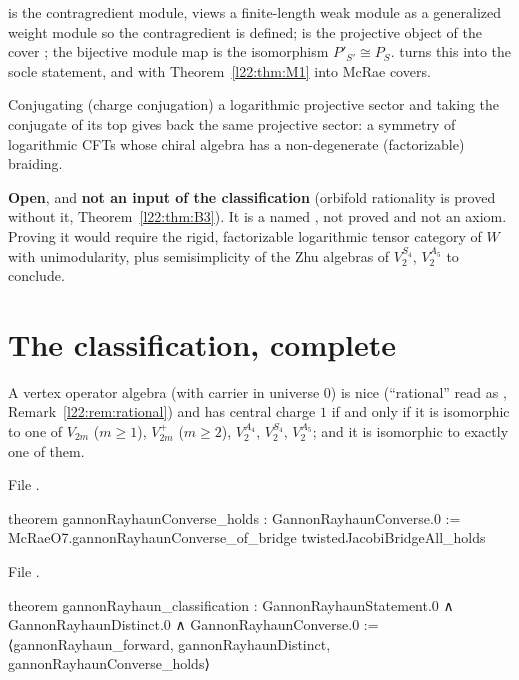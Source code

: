 \begin{dictionary}
 is the contragredient module,  views a finite-length weak module as a generalized
weight module so the contragredient is defined;  is the projective object of the cover ; the bijective
module map  is the isomorphism $P'_{S'}\cong P_S$.  turns this into the
socle statement, and with Theorem~\ref{l22:thm:M1} into McRae covers.
\end{dictionary}

\begin{physics}
Conjugating (charge conjugation) a logarithmic projective sector and taking the conjugate of its top gives back the same
projective sector: a symmetry of logarithmic CFTs whose chiral algebra has a non-degenerate (factorizable) braiding.
\end{physics}

\begin{status}
\textbf{Open}, and \textbf{not an input of the classification} (orbifold rationality is proved without it,
Theorem~\ref{l22:thm:B3}). It is a named , not proved and not an axiom. Proving it would require the rigid, factorizable logarithmic tensor category of $W$ with unimodularity, plus
semisimplicity of the Zhu algebras of $V_2^{S_4}$, $V_2^{A_5}$ to conclude.
\end{status}

\section{The classification, complete}\label{l22:sec:final}

\begin{theorem}\label{l22:thm:final}
A vertex operator algebra (with carrier in universe $0$) is nice (``rational'' read as ,
Remark~\ref{l22:rem:rational}) and has central charge $1$ if and only if it is
isomorphic to one of $V_{2m}$ ($m\ge1$), $V_{2m}^+$ ($m\ge2$), $V_2^{A_4}$, $V_2^{S_4}$, $V_2^{A_5}$; and it is
isomorphic to exactly one of them.
\end{theorem}
\noindent File .
\begin{leancode}
theorem gannonRayhaunConverse_holds : GannonRayhaunConverse.{0} :=
  McRaeO7.gannonRayhaunConverse_of_bridge twistedJacobiBridgeAll_holds
\end{leancode}
\noindent File .
\begin{leancode}
theorem gannonRayhaun_classification :
    GannonRayhaunStatement.{0} ∧ GannonRayhaunDistinct.{0} ∧ GannonRayhaunConverse.{0} :=
  ⟨gannonRayhaun_forward, gannonRayhaunDistinct, gannonRayhaunConverse_holds⟩
\end{leancode}

